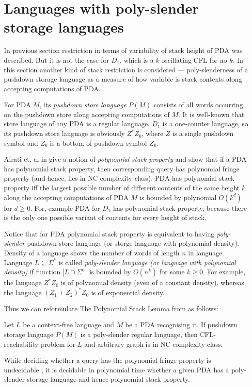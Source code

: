 \section{Languages with poly-slender storage languages}
\label{sec:poly}
In previous section restriction in terms of variability of stack height of PDA was described. But it is not the case for $D_1$, which is a $k$-oscillating CFL for no $k$. In this section another kind of stack restriction is considered --- poly-slenderness of a pushdown storage language as a measure of how variable is stack contents along accepting computations of PDA.


For PDA $M$, its \textit{pushdown store language} $P(M)$ consists of all words
occurring on the pushdown store along accepting computations of $M$. It is well-known that store language of any PDA is a regular language. $D_1$ is a one-counter language, so its pushdown store language is obviously $Z^*Z_0$, where $Z$ is a single pushdown symbol and $Z_0$ is a bottom-of-pushdown symbol $Z_0$.


Afrati et. al in \cite{ChainQ} give a notion of \textit{polynomial stack property} and show that if a PDA has polynomial stack property, then corresponding query has polynomial fringe property (and hence, lies in NC complexity class). PDA has polynomial stack property iff the largest possible number of different contents of the same height $k$ along the accepting computations of PDA $M$ is bounded by polynomial $O(k^d)$ for $d \ge 0$.  For, example PDA for $D_1$ has polynomial stack property, because there is the only one possible variant of contents for every height of stack.


Notice that for PDA polynomial stack property is equivalent to having \textit{poly-slender} pushdown store language (or storge language with polynomial density). Density of a language shows the number of words of length $n$ in language. Language $L \subseteq \Sigma^*$ is called \textit{poly-slender language (or language with polynomial density)} if function $|L \cap \Sigma^n|$ is bounded by $O(n^k)$ for some $k \ge 0$. For example, the language $Z^*Z_0$ is of polynomial density (even of a constant density), whereas the language ${(Z_1 + Z_2)}^*Z_0$ is of exponential density.


Thus we can reformulate The Polynomial Stack Lemma from \cite{ChainQ} as follows:
\begin{lemma}
Let $L$ be a context-free language and $M$ be a PDA recognising it. If pushdown storage language $P(M)$ is a poly-slender regular language, then CFL-reachability problem for $L$ and arbitrary graph is in NC complexity class.
\end{lemma}
While deciding whether a query has the polynomial fringe property is undecidable \cite{Ullman}, it is decidable in polynomial time whether a given PDA has a poly-slender storage language and hence polynomial stack property. 


